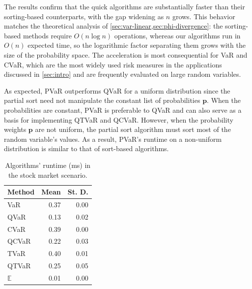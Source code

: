 The results confirm that the quick algorithms are substantially faster than their sorting-based counterparts, with the gap widening as $n$ grows. This behavior matches the theoretical analysis of \cref{sec:var-linear,sec:phi-divergence}: the sorting-based methods require $O(n \log n)$ operations, whereas our algorithms run in $O(n)$ expected time, so the logarithmic factor separating them grows with the size of the probability space. The acceleration is most consequential for VaR and CVaR, which are the most widely used risk measures in the applications discussed in \cref{sec:intro} and are frequently evaluated on large random variables.

As expected, PVaR outperforms QVaR for a uniform distribution since the partial sort need not manipulate the constant list of probabilities $\bm{p}$. When the probabilities are constant, PVaR is preferable to QVaR and can also serve as a basis for implementing QTVaR and QCVaR. However, when the probability weights $\bm{p}$ are not uniform, the partial sort algorithm must sort most of the random variable's values. As a result, PVaR's runtime on a non-uniform distribution is similar to that of sort-based algorithms. 

\begin{table}
\centering
\caption{Algorithms' runtime (ms) in the stock market scenario.}
\label{tab:stock}
\begin{tabular}{lrr}
\toprule
Method & Mean & St. D. \\
\midrule 
VaR & 0.37 & 0.00 \\ 
QVaR & 0.13 & 0.02 \\
\midrule 
CVaR & 0.39 & 0.00 \\ 
QCVaR & 0.22 & 0.03 \\ 
\midrule 
TVaR & 0.40 & 0.01 \\ 
QTVaR & 0.25 & 0.05 \\ 
\midrule 
$\mathbb{E}$ & 0.01 & 0.00 \\
\bottomrule
\end{tabular}
\end{table}

